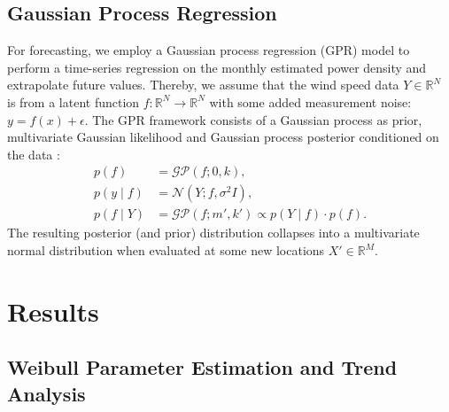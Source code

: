 \documentclass{article}
\theoremstyle{plain}
\theoremstyle{definition}
\theoremstyle{remark}
\begin{document}
\subsection{Gaussian Process Regression}\label{sec:gp}
For forecasting, we employ a Gaussian process regression (GPR) model to perform a time-series
regression on the monthly estimated power density and extrapolate future values. Thereby, we assume
that the wind speed data $Y \in \mathbb{R}^N$ is from a latent function $f: \mathbb{R}^N \rightarrow
\mathbb{R}^N$ with some added measurement noise: $y = f(x) + \epsilon$. The GPR framework consists
of a Gaussian process as prior, multivariate Gaussian likelihood and Gaussian process posterior
conditioned on the data
\cite{rasmussen-williams-gp}:
\begin{align}
    \label{eq:gp_prior}
    p(f) &= \mathcal{GP}(f; 0, k), \\
    \label{eq:gp_likelihood}
    p(y \mid f) &= \mathcal{N}(Y; f, \sigma^2 I), \\
    \label{eq:gp_posterior}
    p(f \mid Y) &= \mathcal{GP}(f; m', k') \propto p(Y \mid f) \cdot p(f).
\end{align}
The resulting posterior (and prior) distribution collapses into a multivariate normal distribution
when evaluated at some new locations $X' \in \mathbb{R}^M$.

\section{Results}\label{sec:results}

\subsection{Weibull Parameter Estimation and Trend Analysis}
\label{sec:trend}
\end{document}
